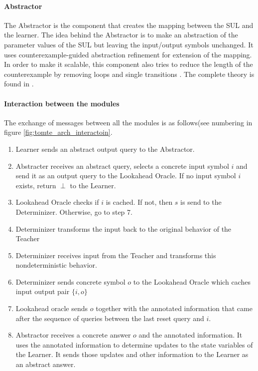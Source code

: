 \documentclass[multi,crop=false,class=article]{standalone}
\begin{document}
\paragraph{Abstractor} The Abstractor is the component that creates the mapping
between the SUL and the learner. The idea behind the Abstractor is to make an
abstraction of the parameter values of the SUL but leaving the input/output
symbols unchanged. It uses counterexample-guided abstraction
refinement\cite{tomte14} for extension of the mapping. In order to make it
scalable, this component also tries to reduce the length of the counterexample
by removing loops and single transitions \cite{Koopman2014}. The complete theory
is found in \cite{tomte14}.

\paragraph{Interaction between the modules} The exchange of messages between
all the modules is as follows(see numbering in figure
\ref{fig:tomte_arch_interactoin}.

\begin{enumerate}
	\item Learner sends an abstract output query to the Abstractor.
	\item Abstracter receives an abstract query, selects a concrete input
	symbol $i$ and send it as an output query to the Lookahead Oracle. If no
	input symbol $i$ exists, return $\perp$ to the Learner.
	\item Lookahead Oracle checks if $i$ is cached. If not, then $s$ is send
	to the Determinizer. Otherwise, go to step 7.
	\item Determinizer transforms the input back to the original behavior of
	the Teacher
	\item Determinizer receives input from the Teacher and transforms this
	nondeterministic behavior.
	\item Determinizer sends concrete symbol $o$ to the Lookahead Oracle which
	caches input output pair $\{i,o\}$
	\item Lookahead oracle sends $o$ together with the annotated information
	that came after the sequence of queries between the last reset query and
	$i$.
	\item Abstractor receives a concrete answer $o$ and the annotated
	information. It uses the annotated information to determine updates to the
	state variables of the Learner. It sends those updates and other
	information to the Learner as an abstract answer.
\end{enumerate}
\end{document}
